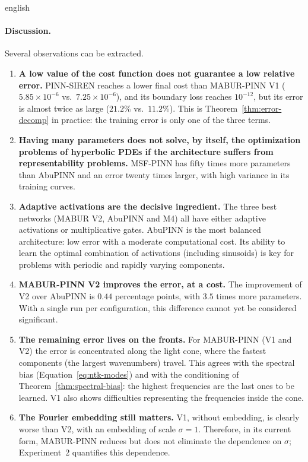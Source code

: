 \documentclass[0000.tex]{subfiles}
\begin{document}
\begin{hyphenrules}{english}
\paragraph{Discussion.}
Several observations can be extracted.
\begin{enumerate}
  \item \textbf{A low value of the cost function does not guarantee a low relative error.} PINN-SIREN
    reaches a lower final cost than MABUR-PINN V1 ($5.85\times10^{-6}$ vs.\ $7.25\times10^{-6}$), and its
    boundary loss reaches $10^{-12}$, but its error is almost twice as large ($21.2\%$ vs.\ $11.2\%$).
    This is Theorem~\ref{thm:error-decomp} in practice: the training error is only one of the three terms.
  \item \textbf{Having many parameters does not solve, by itself, the optimization problems of hyperbolic
    PDEs if the architecture suffers from representability problems.} MSF-PINN has fifty times more
    parameters than AbuPINN and an error twenty times larger, with high variance in its training curves.
  \item \textbf{Adaptive activations are the decisive ingredient.} The three best networks (MABUR V2,
    AbuPINN and M4) all have either adaptive activations or multiplicative gates. AbuPINN is the most
    balanced architecture: low error with a moderate computational cost. Its ability to learn the optimal
    combination of activations (including sinusoids) is key for problems with periodic and rapidly
    varying components.
  \item \textbf{MABUR-PINN V2 improves the error, at a cost.} The improvement of V2 over AbuPINN is
    $0.44$ percentage points, with $3.5$ times more parameters. With a single run per configuration, this
    difference cannot yet be considered significant.
  \item \textbf{The remaining error lives on the fronts.} For MABUR-PINN (V1 and V2) the error is
    concentrated along the light cone, where the fastest components (the largest wavenumbers) travel. This
    agrees with the spectral bias (Equation~\eqref{eq:ntk-modes}) and with the conditioning of
    Theorem~\ref{thm:spectral-bias}: the highest frequencies are the last ones to be learned. V1 also shows
    difficulties representing the frequencies inside the cone.
  \item \textbf{The Fourier embedding still matters.} V1, without embedding, is clearly worse than V2,
    with an embedding of scale $\sigma=1$. Therefore, in its current form, MABUR-PINN reduces but does not
    eliminate the dependence on $\sigma$; Experiment~2 quantifies this dependence.
\end{enumerate}


\end{hyphenrules}
\end{document}
